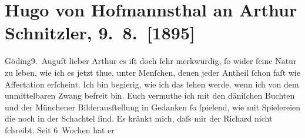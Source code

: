 

         
         \renewcommand{\erwaehntePersonen}{Personen: Richard Beer-Hofmann, Hugo von Hofmannsthal, Fedor Mamroth}
         \renewcommand{\erwaehnteInstitutionen}{Institutionen: Frankfurter Zeitung}
         \renewcommand{\erwaehnteOrte}{Orte: Dänemark, Hodonín, München, Stockerau, Wien, Znaim}
         \renewcommand{\erwaehnteWerke}{}
               \section[Hugo von Hofmannsthal an Arthur Schnitzler, 9. 8. {[}1895{]}]{ Hugo von Hofmannsthal an Arthur Schnitzler, 9. 8. {[}1895{]}}\nopagebreak{}\rehead{ }\begin{ledgroupsized}[t]{13cm}\normalsize\beginnumbering{} \toendnotes[C]{\smallbreak\pagebreak[2]} 
\toendnotes[C]{\smallbreak}\pstart
           \raggedleft{}{\pb}Göding9. Auguſt\pend
           \pstart{}lieber Arthur\pend\pstart
           es iſt doch ſehr merkwürdig, ſo wider ſeine Natur zu leben, wie ich es jetzt thue,
               unter Menſchen, denen jeder Antheil ſchon faſt wie Affectation erſcheint. Ich bin
               begierig, wie ich das ſehen werde, wenn ich von dem unmittelbaren Zwang befreit bin.
               Euch vermuthe ich mit den däniſchen Buchten und
               der Münchener Bilderausſtellung in {\pb}Gedanken ſo ſpielend, wie mit
               Spielereien die noch in der Schachtel ſind. Es kränkt mich, daſs mir der Richard nicht ſchreibt. Seit 6 Wochen hat er

\end{ledgroupsized}
